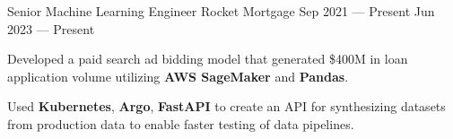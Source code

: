 
\vspace{-0.1cm}
\begin{cventries}
  \cventry
    {Senior Machine Learning Engineer} %
    {Rocket Mortgage} %
    {Sep 2021 --- Present} %
    {Jun 2023 --- Present} %
    {
      \vspace{-0.1cm}
      \begin{cvitems} %
        \item Developed a paid search ad bidding model that generated \$400M in loan application volume utilizing \textbf{AWS SageMaker} and \textbf{Pandas}. 
        \item Used \textbf{Kubernetes}, \textbf{Argo}, \textbf{FastAPI} to create an API for synthesizing datasets from production data to enable faster testing of data pipelines.
      \end{cvitems}
    }
  \vspace{-.15cm}


\end{cventries}
